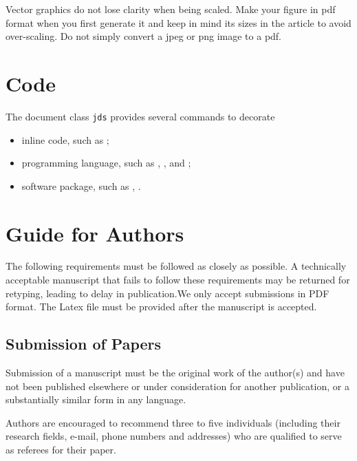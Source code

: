 \documentclass[letterpaper, inpress]{jds} %
\begin{document}
Vector graphics do not lose clarity when being scaled. Make your
figure in pdf format when you first generate it and keep in mind its
sizes in the article to avoid over-scaling. Do not simply convert a
jpeg or png image to a pdf.

\section{Code}%
\label{sec:code}

The document class \texttt{jds} provides several commands to decorate
\begin{itemize}
\item inline code, such as ;
\item programming language, such as , , and
  ;
\item software package, such as , .
\end{itemize}


\section{Guide for Authors}%
\label{sec:guide-authors}

The following requirements must be followed as closely as possible. A
technically acceptable manuscript that fails to follow these requirements may be
returned for retyping, leading to delay in publication.We only accept
submissions in PDF format. The Latex file must be provided after the manuscript
is accepted.

\subsection{Submission of Papers}

Submission of a manuscript must be the original work of the author(s) and have
not been published elsewhere or under consideration for another publication, or
a substantially similar form in any language.

Authors are encouraged to recommend three to five individuals (including their
research fields, e-mail, phone numbers and addresses) who are qualified to serve
as referees for their paper.


\end{document}

